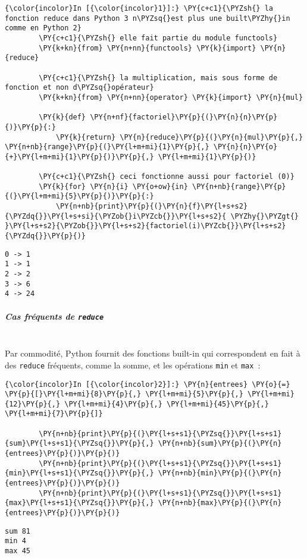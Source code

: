     \begin{Verbatim}[commandchars=\\\{\}]
{\color{incolor}In [{\color{incolor}1}]:} \PY{c+c1}{\PYZsh{} la fonction reduce dans Python 3 n\PYZsq{}est plus une built\PYZhy{}in comme en Python 2}
        \PY{c+c1}{\PYZsh{} elle fait partie du module functools}
        \PY{k+kn}{from} \PY{n+nn}{functools} \PY{k}{import} \PY{n}{reduce}
        
        \PY{c+c1}{\PYZsh{} la multiplication, mais sous forme de fonction et non d\PYZsq{}opérateur}
        \PY{k+kn}{from} \PY{n+nn}{operator} \PY{k}{import} \PY{n}{mul}
        
        \PY{k}{def} \PY{n+nf}{factoriel}\PY{p}{(}\PY{n}{n}\PY{p}{)}\PY{p}{:}
            \PY{k}{return} \PY{n}{reduce}\PY{p}{(}\PY{n}{mul}\PY{p}{,} \PY{n+nb}{range}\PY{p}{(}\PY{l+m+mi}{1}\PY{p}{,} \PY{n}{n}\PY{o}{+}\PY{l+m+mi}{1}\PY{p}{)}\PY{p}{,} \PY{l+m+mi}{1}\PY{p}{)}
        
        \PY{c+c1}{\PYZsh{} ceci fonctionne aussi pour factoriel (0)}
        \PY{k}{for} \PY{n}{i} \PY{o+ow}{in} \PY{n+nb}{range}\PY{p}{(}\PY{l+m+mi}{5}\PY{p}{)}\PY{p}{:}
            \PY{n+nb}{print}\PY{p}{(}\PY{n}{f}\PY{l+s+s2}{\PYZdq{}}\PY{l+s+si}{\PYZob{}i\PYZcb{}}\PY{l+s+s2}{ \PYZhy{}\PYZgt{} }\PY{l+s+s2}{\PYZob{}}\PY{l+s+s2}{factoriel(i)\PYZcb{}}\PY{l+s+s2}{\PYZdq{}}\PY{p}{)}
\end{Verbatim}


    \begin{Verbatim}[commandchars=\\\{\}]
0 -> 1
1 -> 1
2 -> 2
3 -> 6
4 -> 24

    \end{Verbatim}

    \hypertarget{cas-fruxe9quents-de-reduce}{%
\subparagraph{\texorpdfstring{Cas fréquents de
\texttt{reduce}\\\\}{Cas fréquents de reduce}}\label{cas-fruxe9quents-de-reduce}}

    Par commodité, Python fournit des fonctions built-in qui correspondent
en fait à des \texttt{reduce} fréquents, comme la somme, et les
opérations \texttt{min} et \texttt{max}~:

    \begin{Verbatim}[commandchars=\\\{\}]
{\color{incolor}In [{\color{incolor}2}]:} \PY{n}{entrees} \PY{o}{=} \PY{p}{[}\PY{l+m+mi}{8}\PY{p}{,} \PY{l+m+mi}{5}\PY{p}{,} \PY{l+m+mi}{12}\PY{p}{,} \PY{l+m+mi}{4}\PY{p}{,} \PY{l+m+mi}{45}\PY{p}{,} \PY{l+m+mi}{7}\PY{p}{]}
        
        \PY{n+nb}{print}\PY{p}{(}\PY{l+s+s1}{\PYZsq{}}\PY{l+s+s1}{sum}\PY{l+s+s1}{\PYZsq{}}\PY{p}{,} \PY{n+nb}{sum}\PY{p}{(}\PY{n}{entrees}\PY{p}{)}\PY{p}{)}
        \PY{n+nb}{print}\PY{p}{(}\PY{l+s+s1}{\PYZsq{}}\PY{l+s+s1}{min}\PY{l+s+s1}{\PYZsq{}}\PY{p}{,} \PY{n+nb}{min}\PY{p}{(}\PY{n}{entrees}\PY{p}{)}\PY{p}{)}
        \PY{n+nb}{print}\PY{p}{(}\PY{l+s+s1}{\PYZsq{}}\PY{l+s+s1}{max}\PY{l+s+s1}{\PYZsq{}}\PY{p}{,} \PY{n+nb}{max}\PY{p}{(}\PY{n}{entrees}\PY{p}{)}\PY{p}{)}
\end{Verbatim}


    \begin{Verbatim}[commandchars=\\\{\}]
sum 81
min 4
max 45

    \end{Verbatim}